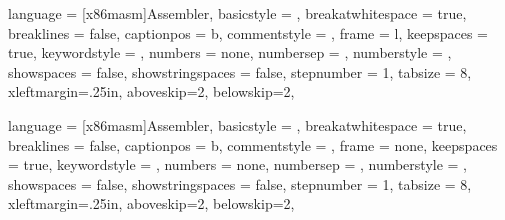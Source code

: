 {
    language = {[x86masm]Assembler},
    basicstyle = \ttfamily,
    breakatwhitespace = true,
    breaklines = false,
    captionpos = b,
    commentstyle = ,
    frame = l,
    keepspaces = true,
    keywordstyle = ,
    numbers = none,
    numbersep = \parindent,
    numberstyle = ,
    showspaces = false,
    showstringspaces = false,
    stepnumber = 1,
    tabsize = 8,
    xleftmargin=.25in,
    aboveskip=2\medskipamount,
    belowskip=2\medskipamount,
}

{
    language = {[x86masm]Assembler},
    basicstyle = \ttfamily,
    breakatwhitespace = true,
    breaklines = false,
    captionpos = b,
    commentstyle = ,
    frame = none,
    keepspaces = true,
    keywordstyle = ,
    numbers = none,
    numbersep = \parindent,
    numberstyle = ,
    showspaces = false,
    showstringspaces = false,
    stepnumber = 1,
    tabsize = 8,
    xleftmargin=.25in,
    aboveskip=2\medskipamount,
    belowskip=2\medskipamount,
}

\lstset {
    style = x86,
    basicstyle = \ttfamily,
    keywordstyle = ,
    commentstyle = ,
    numberstyle = ,
}

